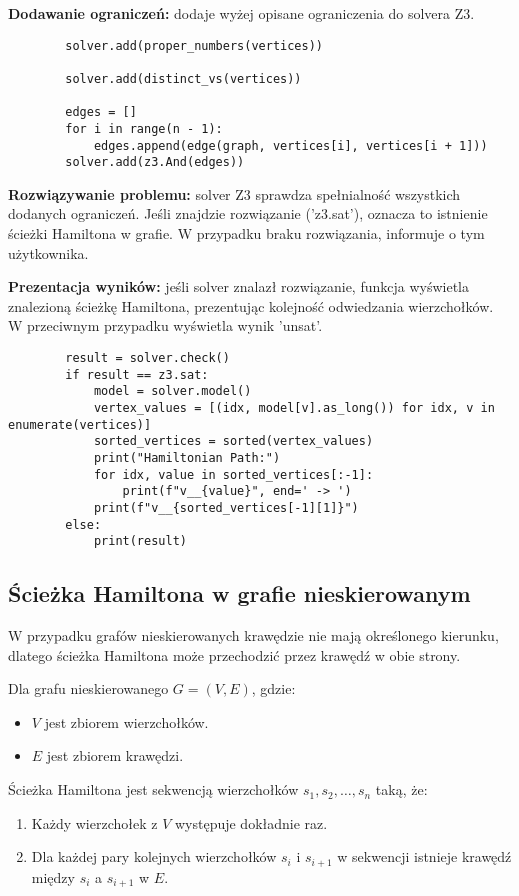\textbf{Dodawanie ograniczeń: } dodaje wyżej opisane ograniczenia do solvera Z3.

\begin{lstlisting}
		solver.add(proper_numbers(vertices))
	
		solver.add(distinct_vs(vertices))
	
		edges = []
		for i in range(n - 1):
			edges.append(edge(graph, vertices[i], vertices[i + 1]))
		solver.add(z3.And(edges))
\end{lstlisting}

\textbf{Rozwiązywanie problemu: } solver Z3 sprawdza spełnialność wszystkich dodanych ograniczeń. Jeśli znajdzie rozwiązanie ('z3.sat'), oznacza to istnienie ścieżki Hamiltona w grafie. W przypadku braku rozwiązania, informuje o tym użytkownika.

\textbf{Prezentacja wyników: } jeśli solver znalazł rozwiązanie, funkcja wyświetla znalezioną ścieżkę Hamiltona, prezentując kolejność odwiedzania wierzchołków. W przeciwnym przypadku wyświetla wynik 'unsat'.

\begin{lstlisting}
		result = solver.check()
		if result == z3.sat:
			model = solver.model()
			vertex_values = [(idx, model[v].as_long()) for idx, v in enumerate(vertices)]
			sorted_vertices = sorted(vertex_values)
			print("Hamiltonian Path:")
			for idx, value in sorted_vertices[:-1]:
				print(f"v__{value}", end=' -> ')
			print(f"v__{sorted_vertices[-1][1]}")
		else:
			print(result)
\end{lstlisting}


\subsection{Ścieżka Hamiltona w grafie nieskierowanym}

W przypadku grafów nieskierowanych krawędzie nie mają określonego kierunku, dlatego ścieżka Hamiltona może przechodzić przez krawędź w obie strony. 

Dla grafu nieskierowanego $G = (V, E)$, gdzie:
\begin{itemize}
	\item \(V\) jest zbiorem wierzchołków.
	\item \(E\) jest zbiorem krawędzi.
\end{itemize}
Ścieżka Hamiltona jest sekwencją wierzchołków $s_1, s_2, …, s_n$ taką, że:
\begin{enumerate}
	\item Każdy wierzchołek z \(V\) występuje dokładnie raz.
	\item Dla każdej pary kolejnych wierzchołków \(s_i\) i \(s_{i+1}\) w sekwencji istnieje krawędź między \(s_i\) a \(s_{i+1}\) w \(E\). 
\end{enumerate}

